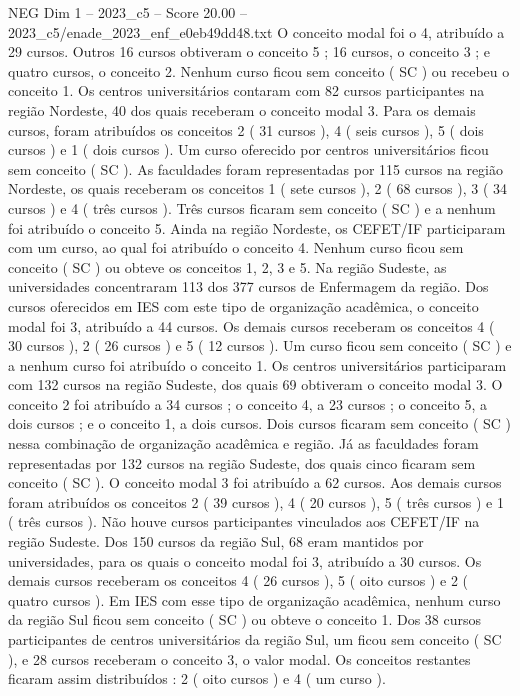 \begin{textsample}{NEG Dim 1 – 2023\_c5 – Score 20.00 – 2023\_c5/enade\_2023\_enf\_e0eb49dd48.txt}
O conceito modal foi o 4, atribuído a 29 cursos.
Outros 16 cursos obtiveram o conceito 5 ; 16 cursos, o conceito 3 ; e quatro cursos, o conceito 2.
Nenhum curso ficou sem conceito ( SC ) ou recebeu o conceito 1.
Os centros universitários contaram com 82 cursos participantes na região Nordeste, 40 dos quais receberam o conceito modal 3.
Para os demais cursos, foram atribuídos os conceitos 2 ( 31 cursos ), 4 ( seis cursos ), 5 ( dois cursos ) e 1 ( dois cursos ).
Um curso oferecido por centros universitários ficou sem conceito ( SC ).
As faculdades foram representadas por 115 cursos na região Nordeste, os quais receberam os conceitos 1 ( sete cursos ), 2 ( 68 cursos ), 3 ( 34 cursos ) e 4 ( três cursos ).
Três cursos ficaram sem conceito ( SC ) e a nenhum foi atribuído o conceito 5.
Ainda na região Nordeste, os CEFET/IF participaram com um curso, ao qual foi atribuído o conceito 4.
Nenhum curso ficou sem conceito ( SC ) ou obteve os conceitos 1, 2, 3 e 5.
Na região Sudeste, as universidades concentraram 113 dos 377 cursos de Enfermagem da região.
Dos cursos oferecidos em IES com este tipo de organização acadêmica, o conceito modal foi 3, atribuído a 44 cursos.
Os demais cursos receberam os conceitos 4 ( 30 cursos ), 2 ( 26 cursos ) e 5 ( 12 cursos ).
Um curso ficou sem conceito ( SC ) e a nenhum curso foi atribuído o conceito 1.
Os centros universitários participaram com 132 cursos na região Sudeste, dos quais 69 obtiveram o conceito modal 3.
O conceito 2 foi atribuído a 34 cursos ; o conceito 4, a 23 cursos ; o conceito 5, a dois cursos ; e o conceito 1, a dois cursos.
Dois cursos ficaram sem conceito ( SC ) nessa combinação de organização acadêmica e região.
Já as faculdades foram representadas por 132 cursos na região Sudeste, dos quais cinco ficaram sem conceito ( SC ).
O conceito modal 3 foi atribuído a 62 cursos.
Aos demais cursos foram atribuídos os conceitos 2 ( 39 cursos ), 4 ( 20 cursos ), 5 ( três cursos ) e 1 ( três cursos ).
Não houve cursos participantes vinculados aos CEFET/IF na região Sudeste.
Dos 150 cursos da região Sul, 68 eram mantidos por universidades, para os quais o conceito modal foi 3, atribuído a 30 cursos.
Os demais cursos receberam os conceitos 4 ( 26 cursos ), 5 ( oito cursos ) e 2 ( quatro cursos ).
Em IES com esse tipo de organização acadêmica, nenhum curso da região Sul ficou sem conceito ( SC ) ou obteve o conceito 1.
Dos 38 cursos participantes de centros universitários da região Sul, um ficou sem conceito ( SC ), e 28 cursos receberam o conceito 3, o valor modal.
Os conceitos restantes ficaram assim distribuídos : 2 ( oito cursos ) e 4 ( um curso ).

\end{textsample}
